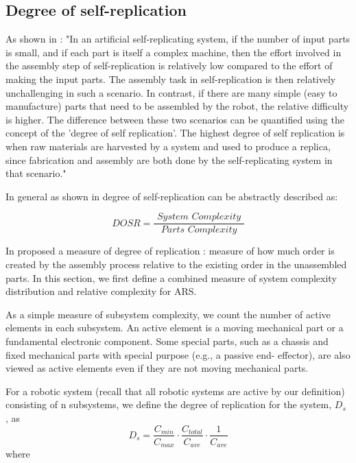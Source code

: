 \subsection{Degree of self-replication}
As shown in \cite{Chirikjian2022Entropy}:
"In an artificial self-replicating system, if the number of input parts is small,
and if each part is itself a complex machine, then the effort involved in the assembly 
step of self-replication is relatively low compared to the effort of making
the input parts. The assembly task in self-replication is then relatively unchallenging 
in such a scenario. In contrast, if there are many simple (easy to
manufacture) parts that need to be assembled by the robot, the relative difficulty 
is higher. The difference between these two scenarios can be quantified
using the concept of the 'degree of self replication'. The highest degree of self
replication is when raw materials are harvested by a system and used to produce
a replica, since fabrication and assembly are both done by the self-replicating
system in that scenario."

In general as shown in \cite{Chirikjian2022Entropy} degree of self-replication 
can be abstractly described as: 

\[\textit{DOSR} = \frac{\textit{ System\ Complexity }}{\textit{ Parts\ Complexity }}\]

In \citeyear{Lee2007Robotic} \citeauthor{Lee2007Robotic} proposed a measure of degree of replication \cite{Lee2007Robotic}:
measure of how much order is created by the assembly process relative to the existing order in
the unassembled parts. 
In this section, we first define a combined measure 
of system complexity distribution and relative complexity for ARS.

As a simple measure of subsystem complexity, we count the number of active elements in
each subsystem. An active element is a moving mechanical part or a fundamental electronic component.
Some special parts, such as a chassis and fixed mechanical parts with special purpose (e.g., a passive end-
effector), are also viewed as active elements even if they are not moving mechanical parts.


For a robotic system (recall that all robotic systems are active by our definition) 
consisting of n subsystems, we define the degree of replication for the system, $D_s$ , as
\begin{equation}
    \label{eq:3}
    D_s = \frac{C_{min}}{C_{max}} \cdot \frac{C_{total}}{C_{ave}} \cdot \frac{1}{C_{ave}} 
\end{equation}
where
    
